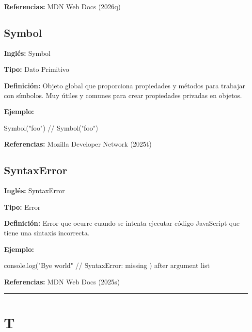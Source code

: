 \documentclass[
  letterpaper,
  DIV=11,
  numbers=noendperiod]{scrreprt}
\newenvironment{Shaded}{\begin{snugshade}}{\end{snugshade}}
\newcommand{\BuiltInTok}[1]{\textcolor[rgb]{0.00,0.23,0.31}{#1}}
\newcommand{\CommentTok}[1]{\textcolor[rgb]{0.37,0.37,0.37}{#1}}
\newcommand{\FunctionTok}[1]{\textcolor[rgb]{0.28,0.35,0.67}{#1}}
\newcommand{\NormalTok}[1]{\textcolor[rgb]{0.00,0.23,0.31}{#1}}
\newcommand{\OperatorTok}[1]{\textcolor[rgb]{0.37,0.37,0.37}{#1}}
\newcommand{\StringTok}[1]{\textcolor[rgb]{0.13,0.47,0.30}{#1}}
\let\oldsubsection\subsection
\renewcommand{\subsection}{\phantomsection\oldsubsection}
\begin{document}
\textbf{Referencias:} MDN Web Docs (2026q)

\subsection*{Symbol}\label{glos-symbol}

\textbf{Inglés:} Symbol

\textbf{Tipo:} Dato Primitivo

\textbf{Definición:} Objeto global que proporciona propiedades y métodos
para trabajar con símbolos. Muy útiles y comunes para crear propiedades
privadas en objetos.

\textbf{Ejemplo:}

\begin{Shaded}
\begin{Highlighting}[]
\BuiltInTok{Symbol}\NormalTok{(}\StringTok{"foo"}\NormalTok{) }\CommentTok{// Symbol("foo")}
\end{Highlighting}
\end{Shaded}

\textbf{Referencias:} Mozilla Developer Network (2025t)

\subsection*{SyntaxError}\label{glos-syntaxerror}

\textbf{Inglés:} SyntaxError

\textbf{Tipo:} Error

\textbf{Definición:} Error que ocurre cuando se intenta ejecutar código
JavaScript que tiene una sintaxis incorrecta.

\textbf{Ejemplo:}

\begin{Shaded}
\begin{Highlighting}[]
\BuiltInTok{console}\OperatorTok{.}\FunctionTok{log}\NormalTok{(}\StringTok{"Bye world"}
\CommentTok{// SyntaxError: missing ) after argument list}
\end{Highlighting}
\end{Shaded}

\textbf{Referencias:} MDN Web Docs (2025s)

\begin{center}\rule{0.5\linewidth}{0.5pt}\end{center}

\section*{T}\label{t}
\end{document}
